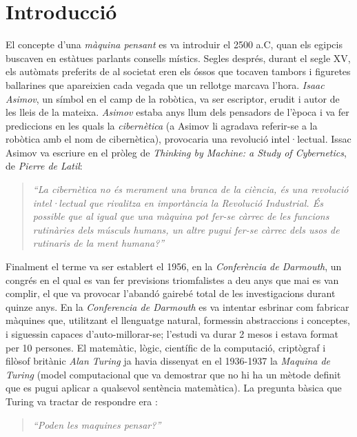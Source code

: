 \section{Introducció}

El concepte d'una \emph{màquina pensant} es va introduir el 2500 a.C, quan els egipcis buscaven en estàtues parlants consells místics. Segles després, durant el segle XV, els autòmats preferits de al societat eren els óssos que tocaven tambors i figuretes ballarines que apareixien cada vegada que un rellotge marcava l'hora. \emph{Isaac Asimov}, un símbol en el camp de la robòtica, va ser escriptor, erudit i autor de les lleis de la mateixa. \emph{Asimov} estaba anys llum dels pensadors de l'època i va fer prediccions en les quals la \emph{cibernètica} (a Asimov li agradava referir-se a la robòtica amb el nom de cibernètica), provocaria una revolució intel·lectual. 
Issac Asimov va escriure en el pròleg de \emph{Thinking by Machine: a Study of Cybernetics}, de \emph{Pierre de Latil}:

\begin{quote}
\emph{``La cibernètica no és merament una branca de la ciència, és una revolució intel·lectual que rivalitza en importància la Revolució Industrial. És possible que al igual que una màquina pot fer-se càrrec de les funcions rutinàries dels músculs humans, un altre pugui fer-se càrrec dels usos de rutinaris de la ment humana?''}

\end{quote}

Finalment el terme va ser establert el 1956, en la \emph{Conferència de Darmouth}, un congrés en el qual es van fer previsions triomfalistes a deu anys que mai es van complir, el que va provocar l'abandó gairebé total de les investigacions durant quinze anys. En la \emph{Conferencia de Darmouth} es va intentar esbrinar com fabricar màquines que, utilitzant el llenguatge natural, formessin abstraccions i conceptes, i siguessin capaces d'auto-millorar-se; l'estudi va durar 2 mesos i estava format per 10 persones. El matemàtic, lògic, científic de la computació, criptògraf  i filòsof britànic \emph{Alan Turing} ja havia dissenyat en el 1936-1937 la \emph{Maquina de Turing} (model computacional que va demostrar que no hi ha un mètode definit que es pugui aplicar a qualsevol sentència matemàtica). La pregunta bàsica que Turing va tractar de respondre era \cite{MaTur} \cite{Algor}: 

\begin{quote}
	\emph{``Poden les maquines pensar?''}
\end{quote}

